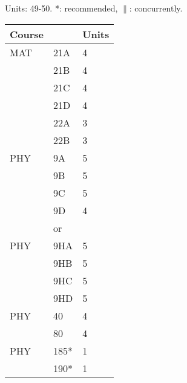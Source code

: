 \documentclass[12pt]{article}
\begin{document}
\noindent
\vskip 0.25cm
\begin{center}
Units:  49-50. *: recommended, $\parallel$: concurrently.\\
\begin{tabular}{|lll|}
\hline
Course & & Units \\
\hline
MAT & 21A & 4 \\  
    & 21B & 4 \\ 
    & 21C & 4 \\ 
    & 21D & 4 \\ 
    & 22A & 3 \\ 
    & 22B & 3 \\ 
\hline
\hline
PHY & 9A & 5 \\  
    & 9B & 5 \\  
    & 9C & 5 \\  
    & 9D & 4 \\  
\hline
&or&\\
\hline
PHY & 9HA & 5 \\  
    & 9HB & 5 \\  
    & 9HC & 5 \\  
    & 9HD & 5 \\  
\hline
\hline
PHY & 40   & 4 \\  
    & 80   & 4 \\ 
PHY & 185* & 1 \\ 
    & 190* & 1 \\ 
\hline
\end{tabular}
\end{center}
\end{document}
